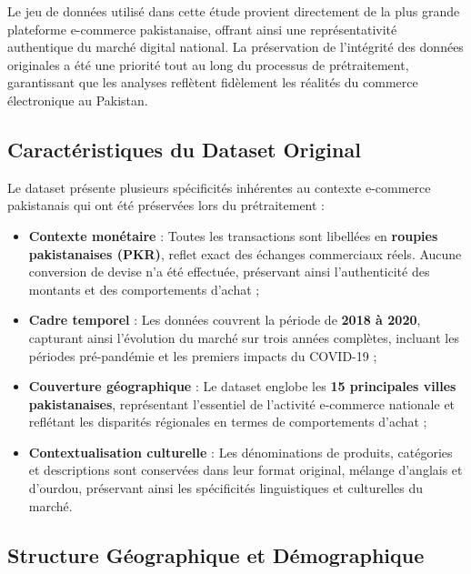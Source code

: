 \documentclass[a4paper,12pt]{article}
\begin{document}
Le jeu de données utilisé dans cette étude provient directement de la plus grande plateforme e-commerce pakistanaise, offrant ainsi une représentativité authentique du marché digital national. La préservation de l'intégrité des données originales a été une priorité tout au long du processus de prétraitement, garantissant que les analyses reflètent fidèlement les réalités du commerce électronique au Pakistan.

\subsection{Caractéristiques du Dataset Original}

Le dataset présente plusieurs spécificités inhérentes au contexte e-commerce pakistanais qui ont été préservées lors du prétraitement :

\begin{itemize}
    \item \textbf{Contexte monétaire} : Toutes les transactions sont libellées en \textbf{roupies pakistanaises (PKR)}, reflet exact des échanges commerciaux réels. Aucune conversion de devise n'a été effectuée, préservant ainsi l'authenticité des montants et des comportements d'achat ;
    
    \item \textbf{Cadre temporel} : Les données couvrent la période de \textbf{2018 à 2020}, capturant ainsi l'évolution du marché sur trois années complètes, incluant les périodes pré-pandémie et les premiers impacts du COVID-19 ;
    
    \item \textbf{Couverture géographique} : Le dataset englobe les \textbf{15 principales villes pakistanaises}, représentant l'essentiel de l'activité e-commerce nationale et reflétant les disparités régionales en termes de comportements d'achat ;
    
    \item \textbf{Contextualisation culturelle} : Les dénominations de produits, catégories et descriptions sont conservées dans leur format original, mélange d'anglais et d'ourdou, préservant ainsi les spécificités linguistiques et culturelles du marché.
\end{itemize}

\subsection{Structure Géographique et Démographique}
\end{document}
